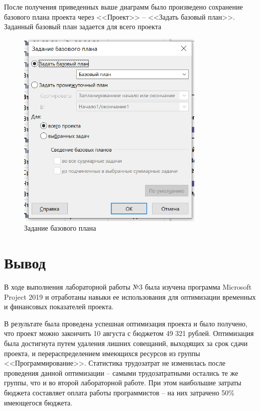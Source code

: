 После получения приведенных выше диаграмм было произведено сохранение базового плана проекта через <<Проект>> -- <<Задать базовый план>>. Заданный базовый план задается для всего проекта

\begin{figure}[H]
    \centering
    \includegraphics[width=0.8\textwidth]{img/content/task_3_finish.png}
    \caption{Задание базового плана}
    \label{fig:task_3_finish}
\end{figure}

\section{Вывод}

В ходе выполнения лабораторной работы №3 была изучена программа Microsoft Project 2019 и отработаны навыки ее использования для оптимизации временных и финансовых показателей проекта.

В результате была проведена успешная оптимизация проекта и было получено, что проект можно закончить 10 августа с бюджетом 49 321 рублей. Оптимизация была достигнута путем удаления лишних совещаний, выходящих за срок сдачи проекта, и перераспределением имеющихся ресурсов из группы <<Программирование>>. Статистика трудозатрат не изменилась после проведения данной оптимизации – самыми трудозатратными остались те же группы, что и во второй лабораторной работе. При этом наибольшие затраты бюджета составляет оплата работы программистов -- на них затрачено 50\% имеющегося бюджета.
